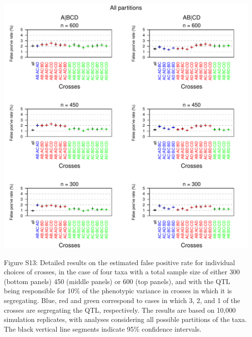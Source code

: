 \documentclass[letterpaper,twoside]{article}
\begin{document}
{\centering
\includegraphics{SuppFigs/detailedfp_allpart.pdf}}

\bigskip \noindent
Figure S13: Detailed results on the estimated false positive rate
  for individual choices of crosses, in the case of four taxa
  with a total sample size of either 300 (bottom panels)
  450 (middle panels) or 600 (top panels),
  and with the QTL being responsible
  for 10\% of the phenotypic variance in crosses in which it is
  segregating. Blue, red and green correspond to cases in which 3, 2,
  and 1 of the crosses are segregating the QTL, respectively.  The
  results are based on 10,000 simulation replicates, with analyses
  considering all possible partitions of the taxa.  The black vertical
  line segments indicate 95\% confidence
  intervals.

\newpage
\end{document}
